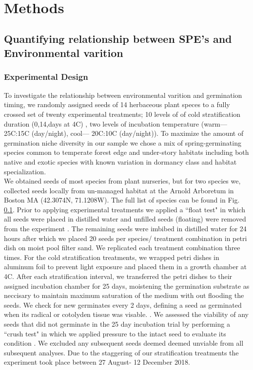 \documentclass[11pt]{article}\usepackage[]{graphicx}\usepackage[]{color}
\begin{document}
\section*{Methods}
\subsection{Quantifying relationship between SPE's and Environmental varition}
\subsubsection*{Experimental Design}
To investigate the relationship between environmental varition and germination timing, we randomly assigned seeds of 14 herbaceous plant speces to a  fully crossed set of twenty experimental treatments; 10 levels of of cold stratification duration (0,14,days at 4\degree C) , two levels of incubation temperature (warm--- 25\degree C:15\degree C (day/night), cool--- 20\degree C:10\degree C (day/night)). To maximize the amount of germination niche diversity in our sample we chose a mix of spring-germinating species common to temperate forest edge and under-story habitats including both native and exotic species with known variation in dormancy class and habitat specialization.\\
\noindent  We obtained seeds of most species from plant nurseries, but for two species we, collected seeds locally from un-managed habitat at the Arnold Arboretum in Boston MA (42.3074\degree N, 71.1208\degree W). The full list of species can be found in Fig. \ref{}. Prior to applying experimental treatments we applied a ``float test" in which all seeds were placed in distilled water and unfilled seeds (floating) were removed from the experiment \citep{}. The remaining seeds were imbibed in distilled water for 24 hours after which we placed 20 seeds per species/ treatment combination in petri dish on moist pool filter sand. We replicated each treatment combination three times. For the cold stratification treatments, we wrapped petri dishes in aluminum foil to prevent light exposure and placed them in a growth chamber at 4\degree C. After each stratification interval, we transferred the petri dishes to their assigned incubation chamber for 25 days, moistening the germination substrate as neccisary to maintain maximum saturation of the medium with out flooding the seeds. We check for new germinates every 2 days, defining a seed as germinated when its radical or cotolyden tissue was visable.  \citep{}. We assessed the viability of any seeds that did not germinate in the 25 day incubation trial by performing a ``crush test" in which we applied pressure to the intact seed to evaluate its condition \citep{}. We excluded any subsequent seeds deemed deemed unviable from all subsequent analyses. Due to the staggering of our stratification treatments the experiment took place between 27 August- 12 December 2018.\\
\end{document}
